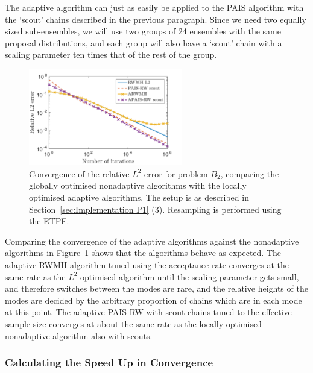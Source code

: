 \documentclass[final]{siamltex}
\begin{document}
The adaptive algorithm can just as easily be applied to the PAIS algorithm with the `scout' chains described in the previous paragraph. Since we need two equally sized sub-ensembles, we will use two groups of 24 ensembles with the same proposal distributions, and each group will also have a `scout' chain with a scaling parameter ten times that of the rest of the group.

\begin{figure}[htb]
\begin{center}
\includegraphics[width=0.6\textwidth]{"figures/BM2_AL2"}
\caption{Convergence of the relative $L^2$ error for problem $B_2$, comparing the globally optimised nonadaptive algorithms with the locally optimised adaptive algorithms. The setup is as described in Section~\ref{sec:Implementation P1} (3). Resampling is performed using the ETPF.}
\label{fig:BM2_AL2}
\end{center}
\end{figure}

Comparing the convergence of the adaptive algorithms against the
nonadaptive algorithms in Figure~\ref{fig:BM2_AL2} shows that the
algorithms behave as expected. The adaptive RWMH algorithm tuned using
the acceptance rate converges at the same rate as the $L^2$ optimised
algorithm until the scaling parameter gets small, and therefore
switches between the modes are rare, and the relative heights of the
modes are decided by the arbitrary proportion of chains which are in
each mode at this point. The adaptive PAIS-RW with scout chains tuned to the effective sample size converges at about the same rate as the locally optimised nonadaptive algorithm also with scouts.

\subsubsection{Calculating the Speed Up in Convergence}\label{sec:calc_saving}
\end{document}
